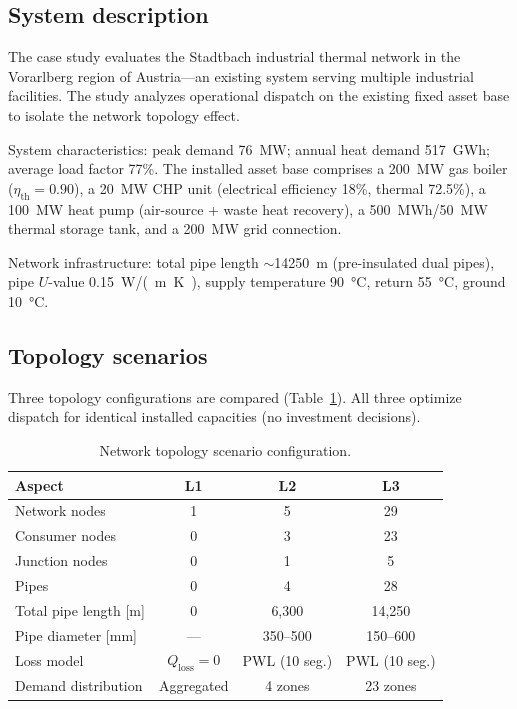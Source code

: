 \documentclass[a4paper,fleqn]{cas-dc}
\begin{document}
\subsection{System description}

The case study evaluates the Stadtbach industrial thermal network in the Vorarlberg region of Austria---an existing system serving multiple industrial facilities. The study analyzes operational dispatch on the existing fixed asset base to isolate the network topology effect.

System characteristics: peak demand \SI{76}{MW}; annual heat demand \SI{517}{GWh}; average load factor 77\%. The installed asset base comprises a \SI{200}{MW} gas boiler ($\eta_\mathrm{th} = 0.90$), a \SI{20}{MW} CHP unit (electrical efficiency 18\%, thermal 72.5\%), a \SI{100}{MW} heat pump (air-source + waste heat recovery), a \SI{500}{MWh}/\SI{50}{MW} thermal storage tank, and a \SI{200}{MW} grid connection.

Network infrastructure: total pipe length $\sim$\SI{14250}{m} (pre-insulated dual pipes), pipe $U$-value \SI{0.15}{W/(m.K)}, supply temperature \SI{90}{\degreeCelsius}, return \SI{55}{\degreeCelsius}, ground \SI{10}{\degreeCelsius}.

\subsection{Topology scenarios}

Three topology configurations are compared (Table~\ref{tab:topology}). All three optimize dispatch for identical installed capacities (no investment decisions).

\begin{table}[t]
\centering
\caption{Network topology scenario configuration.}\label{tab:topology}
\begin{tabular*}{\tblwidth}{@{}lccc@{}}
\toprule
Aspect & \textbf{L1} & \textbf{L2} & \textbf{L3} \\
\midrule
Network nodes & 1 & 5 & 29 \\
Consumer nodes & 0 & 3 & 23 \\
Junction nodes & 0 & 1 & 5 \\
Pipes & 0 & 4 & 28 \\
Total pipe length [m] & 0 & 6,300 & 14,250 \\
Pipe diameter [mm] & --- & 350--500 & 150--600 \\
Loss model & $Q_\mathrm{loss}=0$ & PWL (10 seg.) & PWL (10 seg.) \\
Demand distribution & Aggregated & 4 zones & 23 zones \\
\bottomrule
\end{tabular*}
\end{table}
\end{document}
